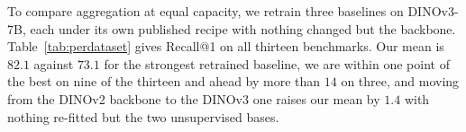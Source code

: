 \label{sec:exp-vs}
\label{sec:burden}
\label{sec:scale}

To compare aggregation at equal capacity, we retrain three baselines on DINOv3-7B, each under its own published recipe with nothing changed but the backbone. Table~\ref{tab:perdataset} gives Recall@1 on all thirteen benchmarks. Our mean is $82.1$ against $73.1$ for the strongest retrained baseline, we are within one point of the best on nine of the thirteen and ahead by more than $14$ on three, and moving from the DINOv2 backbone to the DINOv3 one raises our mean by $1.4$ with nothing re-fitted but the two unsupervised bases.

\begin{table}[t]
\caption{\textbf{Matched-backbone comparison, per dataset.} R@1 on the thirteen benchmarks: \emph{v2} is a DINOv2 backbone, \emph{v3} a DINOv3 one: for the baselines their published backbone and a retraining on DINOv3-7B, for us DINOv2-G and DINOv3-7B, both frozen. \emph{Dim} is the first-stage descriptor dimensionality. Bold $=$ best, \underline{underline} $=$ second, over all rows. Our runs.}
\label{tab:perdataset}
\centering
{\scriptsize\setlength{\tabcolsep}{2.6pt}%
}
\end{table}
